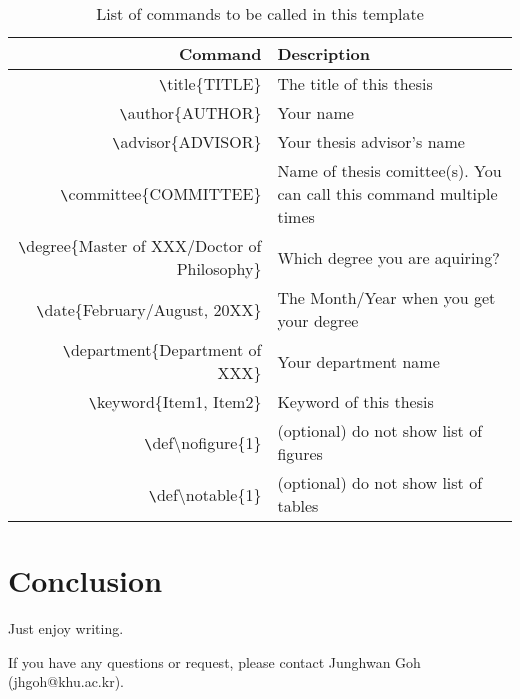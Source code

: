 \documentclass[11pt]{article}
\begin{document}
\begin{table}[h]
    \centering
    \caption{List of commands to be called in this template}\label{tab:commands}
    \begin{tabular}{r|l}
        \hline
        Command & Description \\
        \hline\hline
        {\texttt\textbackslash{}title\{TITLE\}} & The title of this thesis \\
        {\texttt\textbackslash{}author\{AUTHOR\}} & Your name \\
        {\texttt\textbackslash{}advisor\{ADVISOR\}} & Your thesis advisor's name \\
        {\texttt\textbackslash{}committee\{COMMITTEE\}} & Name of thesis comittee(s). You can call this command multiple times \\
        {\texttt\textbackslash{}degree\{Master of XXX/Doctor of Philosophy\}} & Which degree you are aquiring? \\
        {\texttt\textbackslash{}date\{February/August, 20XX\}} & The Month/Year when you get your degree \\
        {\texttt\textbackslash{}department\{Department of XXX\}} & Your department name \\
        {\texttt\textbackslash{}keyword\{Item1, Item2\}} & Keyword of this thesis \\
        {\texttt\textbackslash{}def\textbackslash{}nofigure\{1\}} & (optional) do not show list of figures \\
        {\texttt\textbackslash{}def\textbackslash{}notable\{1\}} & (optional) do not show list of tables \\
        \hline
    \end{tabular}
\end{table}

\section{Conclusion}
Just enjoy writing. 

If you have any questions or request, please contact Junghwan Goh (jhgoh@khu.ac.kr).

\newpage

\end{document}
